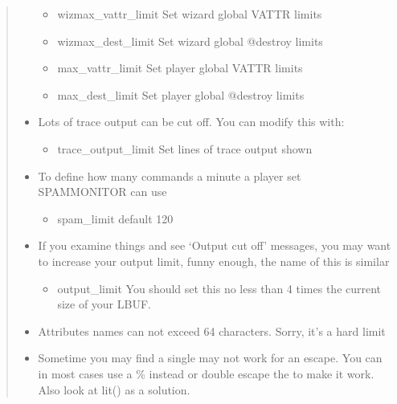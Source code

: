 \documentclass[letterpaper,10pt,english]{sphinxmanual}
\begin{document}
\begin{quote}
\begin{itemize}
\begin{itemize}
\item {} 
\sphinxAtStartPar
wizmax\_vattr\_limit   \sphinxhyphen{} Set wizard global VATTR limits

\item {} 
\sphinxAtStartPar
wizmax\_dest\_limit    \sphinxhyphen{} Set wizard global @destroy limits

\item {} 
\sphinxAtStartPar
max\_vattr\_limit      \sphinxhyphen{} Set player global VATTR limits

\item {} 
\sphinxAtStartPar
max\_dest\_limit       \sphinxhyphen{} Set player global @destroy limits

\end{itemize}

\item {} 
\sphinxAtStartPar
Lots of trace output can be cut off.  You can modify this with:
\begin{itemize}
\item {} 
\sphinxAtStartPar
trace\_output\_limit   \sphinxhyphen{} Set lines of trace output shown

\end{itemize}

\item {} 
\sphinxAtStartPar
To define how many commands a minute a player set SPAMMONITOR can use
\begin{itemize}
\item {} 
\sphinxAtStartPar
spam\_limit \textendash{} default 120

\end{itemize}

\item {} 
\sphinxAtStartPar
If you examine things and see ‘Output cut off’ messages, you may want
to increase your output limit, funny enough, the name of this is
similar
\begin{itemize}
\item {} 
\sphinxAtStartPar
output\_limit \sphinxhyphen{} You should set this no less than 4 times the current size of your LBUF.

\end{itemize}

\item {} 
\sphinxAtStartPar
Attributes names can not exceed 64 characters.  Sorry, it’s a hard limit

\item {} 
\sphinxAtStartPar
Sometime you may find a single may not work for an escape.  You can
in most cases use a \% instead or double escape the to make it work.
Also look at lit() as a solution.

\end{itemize}
\end{quote}
\end{document}
